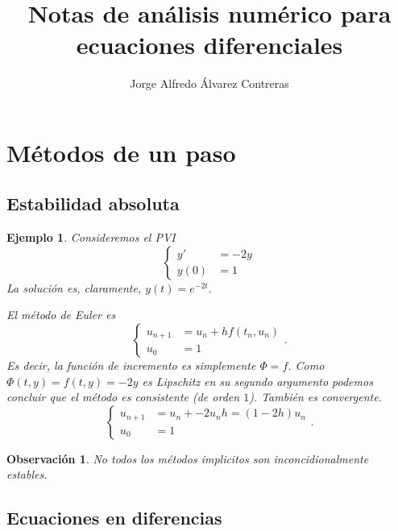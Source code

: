 \documentclass[11pt,letterpaper]{article}
\title{Notas de análisis numérico para ecuaciones diferenciales}
\author{Jorge Alfredo Álvarez Contreras}
\newtheorem{example}{Ejemplo}
\newtheorem{remark}{Observación}
\begin{document}
\maketitle

\section{Métodos de un paso}

\subsection{Estabilidad absoluta}

\begin{example}
  Consideremos el PVI
  \begin{equation}
    \left\{
    \begin{aligned}
      y' &= -2y \\
      y(0) &= 1
    \end{aligned}
    \right.
  \end{equation}
  La solución es, claramente, $y(t)=e^{-2t}$.

  El método de Euler es
  \begin{equation}
    \left\{
    \begin{aligned}
      u_{n+1} &= u_n + hf(t_n,u_n) \\
      u_0 &= 1
    \end{aligned}
    \right.
  .\end{equation}
  Es decir, la función de incremento es simplemente $\Phi=f$.
  Como $\Phi(t,y)=f(t,y)=-2y$ es Lipschitz en su segundo argumento
  podemos concluir que el método es consistente (de orden $1$).
  También es convergente.
  \begin{equation}
    \left\{
    \begin{aligned}
      u_{n+1} &= u_n + -2u_nh = (1-2h)u_n \\
      u_0 &= 1
    \end{aligned}
    \right.
  .\end{equation}
  

\end{example}

\begin{remark}
  No todos los métodos implicitos son inconcidionalmente estables.
\end{remark}

\subsection{Ecuaciones en diferencias }
\end{document}
